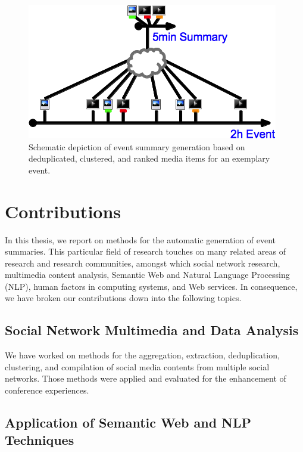 \begin{figure}[h!]
  \centering
  \includegraphics[]{thesis-diagram.png}
  \caption[Schematic depiction of event summary generation]
    {Schematic depiction of event summary generation
    based on deduplicated, clustered, and ranked media items
    for an exemplary event.}
  \label{fig:thesis-diagram}
\end{figure}

\section{Contributions}

In this thesis, we report on methods for
the automatic generation of event summaries.
This particular field of research touches on many related areas
of research and research communities,
amongst which social network research, multimedia content analysis,
Semantic Web and Natural Language Processing (NLP),
human factors in computing systems,
and Web services.
In consequence, we have broken our contributions down into
the following topics.

\subsection{Social Network Multimedia and Data Analysis}

We have worked on methods for the aggregation, extraction,
deduplication, clustering, and compilation
of social media contents from
multiple social networks.
Those methods were applied and evaluated
for the enhancement of conference experiences.

\subsection{Application of Semantic Web and NLP Techniques}

